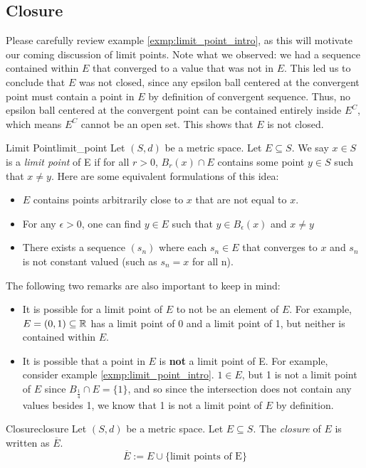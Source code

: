 \subsection{Closure}
Please carefully review example \ref{exmp:limit_point_intro}, as this will motivate our coming discussion of limit points. Note what we observed: we had a sequence contained within \(E\) that converged to a value that was not in \(E\). This led us to conclude that \(E\) was not closed, since any epsilon ball centered at the convergent point must contain a point in \(E\) by definition of convergent sequence. Thus, no epsilon ball centered at the convergent point can be contained entirely inside \(E^C\), which means \(E^C\) cannot be an open set. This shows that \(E\) is not closed. 
\begin{defn}{Limit Point}{limit_point}
Let \((S, d)\) be a metric space. Let \(E \subseteq S\). We say \(x \in S\) is a \textit{limit point} of E if for all \(r > 0\), \(B_r(x) \cap E\) contains some point \(y \in S\) such that \(x \not = y\). Here are some equivalent formulations of this idea:
	\begin{itemize}
  		\item \(E\) contains points arbitrarily close to \(x\) that are not equal to \(x\).  
  		\item For any \(\epsilon > 0\), one can find \(y \in E\) such that \(y \in B_{\epsilon}(x)\) and \(x \not = y\)
  		\item There exists a sequence \((s_n)\) where each \(s_n \in E\) that converges to \(x\) and \(s_n\) is not constant valued (such as \(s_n = x\) for all n).
	\end{itemize}
The following two remarks are also important to keep in mind: 
\begin{itemize}
  \item It is possible for a limit point of \(E\) to not be an element of \(E\). For example, \(E = (0, 1) \subseteq {\mathbb R}\) has a limit point of 0 and a limit point of 1, but neither is contained within \(E\).
  \item It is possible that a point in \(E\) is \textbf{not} a limit point of E. For example, consider example \ref{exmp:limit_point_intro}. \(1 \in E\), but 1 is not a limit point of \(E\) since \(B_{\frac{1}{4}} \cap E = \{1\}\), and so since the intersection does not contain any values besides 1, we know that 1 is not a limit point of \(E\) by definition. 
\end{itemize}


\end{defn}
\begin{defn}{Closure}{closure}
Let \((S, d)\) be a metric space. Let \(E \subseteq S\). The \textit{closure} of \(E\) is written as \(\overline{E}\). 
\begin{equation*}
  \overline{E} := E \cup \{\textrm{limit points of E}\}
\end{equation*}

\end{defn}



